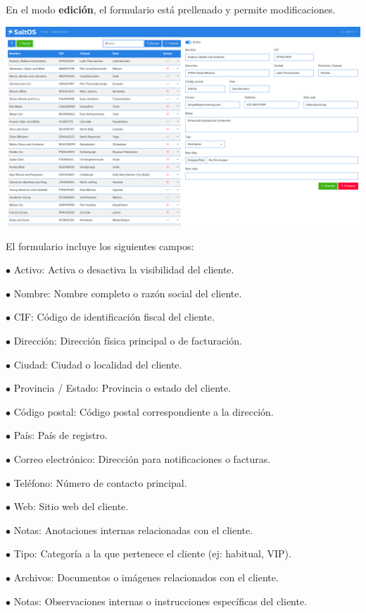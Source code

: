 \documentclass[a4paper]{article}
\begin{document}
En el modo \textbf{edición}, el formulario está prellenado y permite modificaciones.

\begin{center}\includegraphics[width=1\textwidth]{../ujest/snaps/test-screenshots-js-screenshots-crm-customers-edit-100-es-es-1-snap.png}\end{center}

El formulario incluye los siguientes campos:

\begin{compactitem}
\item[\color{myblue}$\bullet$] Activo: Activa o desactiva la visibilidad del cliente.
\item[\color{myblue}$\bullet$] Nombre: Nombre completo o razón social del cliente.
\item[\color{myblue}$\bullet$] CIF: Código de identificación fiscal del cliente.
\item[\color{myblue}$\bullet$] Dirección: Dirección física principal o de facturación.
\item[\color{myblue}$\bullet$] Ciudad: Ciudad o localidad del cliente.
\item[\color{myblue}$\bullet$] Provincia / Estado: Provincia o estado del cliente.
\item[\color{myblue}$\bullet$] Código postal: Código postal correspondiente a la dirección.
\item[\color{myblue}$\bullet$] País: País de registro.
\item[\color{myblue}$\bullet$] Correo electrónico: Dirección para notificaciones o facturas.
\item[\color{myblue}$\bullet$] Teléfono: Número de contacto principal.
\item[\color{myblue}$\bullet$] Web: Sitio web del cliente.
\item[\color{myblue}$\bullet$] Notas: Anotaciones internas relacionadas con el cliente.
\item[\color{myblue}$\bullet$] Tipo: Categoría a la que pertenece el cliente (ej: habitual, VIP).
\item[\color{myblue}$\bullet$] Archivos: Documentos o imágenes relacionados con el cliente.
\item[\color{myblue}$\bullet$] Notas: Observaciones internas o instrucciones específicas del cliente.
\end{compactitem}
\end{document}
